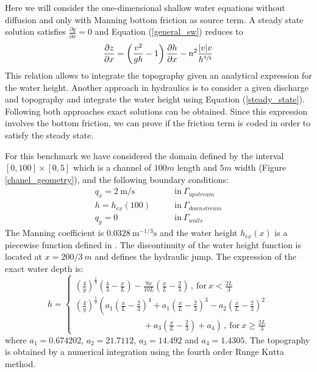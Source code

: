 \documentclass[a4paper,12pt]{article}
\newcommand{\pder}[2]{\frac{\partial#1}{\partial#2}}
\newcommand{\abs}[1]{\lvert#1\rvert}
\begin{document}
Here we will consider the one-dimensional shallow water equations without diffusion and only with Manning bottom friction as source term. A steady state solution satisfies $\pder{q}{x}=0$ and Equation (\ref{general_sw}) reduces to
\begin{equation} \label{steady_state}
\pder{z}{x} = \left(\frac{v^2}{gh}-1\right) \pder{h}{x} - n^2\frac{\abs{v}v}{h^{\sfrac{4}{3}}}
\end{equation}
This relation allows to integrate the topography given an analytical expression for the water height. Another approach in hydraulics is to consider a given discharge and topography and integrate the water height using Equation (\ref{steady_state}). Following both approaches exact solutions can be obtained. Since this expression involves the bottom friction, we can prove if the friction term is coded in order to satisfy the steady state.

For this benchmark we have considered the domain defined by the interval $[0,100]\times[0,5]$ which is a channel of $100m$ length and $5m$ width (Figure \ref{chanel_geometry}), and the following boundary conditions:
\begin{equation}
\begin{split}
    q_x = 2\ \text{m/s} \qquad &\text{in} \ \Gamma_{upstream} \\
    h = h_{ex}(100) \qquad &\text{in} \ \Gamma_{downstream} \\
    q_y = 0 \qquad &\text{in} \ \Gamma_{walls}
\end{split}
\end{equation}
The Manning coefficient is $0.0328\ \text{m}^{-1/3}\text{s}$ and the water height $h_{ex}(x)$ is a piecewise function defined in \cite{delestre2013}. The discontinuity of the water height function is located at $x=200/3\ m$ and defines the hydraulic jump. The expression of the exact water depth is:
\begin{equation} \label{jump_height_definition}
    h = \begin{cases}
        \left(\frac{4}{g}\right)^\frac{1}{3} \left(\frac{4}{3} - \frac{x}{L}\right) - \frac{9x}{10L}
            \left(\frac{x}{L} - \frac{2}{3}\right) \, ,\ \text{for} \ x < \frac{2L}{3}\\
        \left(\frac{4}{g}\right)^\frac{1}{3} \left(
              a_1 \left(\frac{x}{L} - \frac{2}{3}\right)^4
            + a_1 \left(\frac{x}{L} - \frac{2}{3}\right)^3
            - a_2 \left(\frac{x}{L} - \frac{2}{3}\right)^2 \right. \\ \left. \qquad\qquad\qquad\qquad
            + a_3 \left(\frac{x}{L} - \frac{2}{3}\right)
            + a_4
        \right) \, ,\ \text{for} \ x \geq \frac{2L}{3}
    \end{cases}
\end{equation}
where $a_1=0.674202$, $a_2=21.7112$, $a_3=14.492$ and $a_4=1.4305$. The topography is obtained by a numerical integration using the fourth order Runge Kutta method.
\end{document}
